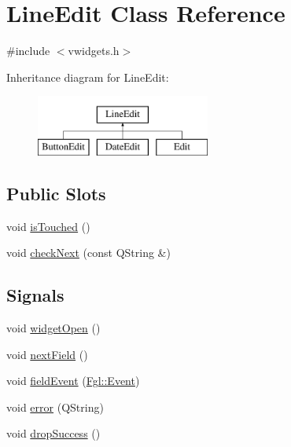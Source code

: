 \hypertarget{classLineEdit}{
\section{LineEdit Class Reference}
\label{classLineEdit}
}


{\ttfamily \#include $<$vwidgets.h$>$}

Inheritance diagram for LineEdit:\begin{figure}[H]
\begin{center}
\leavevmode
\includegraphics[height=2.000000cm]{classLineEdit}
\end{center}
\end{figure}
\subsection*{Public Slots}
\begin{DoxyCompactItemize}
\item 
void \hyperlink{classLineEdit_ad3cd1fe6bd62dfbd72e071054711015d}{isTouched} ()
\item 
void \hyperlink{classLineEdit_ae01737e586a9fc6f880c15885b7e8479}{checkNext} (const QString \&)
\end{DoxyCompactItemize}
\subsection*{Signals}
\begin{DoxyCompactItemize}
\item 
void \hyperlink{classLineEdit_a5d13e4462115bd039c90f38429a7de14}{widgetOpen} ()
\item 
void \hyperlink{classLineEdit_ad00eb1212a7343c7f80d65a19d23c4e0}{nextField} ()
\item 
void \hyperlink{classLineEdit_acb394b5ebd47db7a2fddf3ba3d57344e}{fieldEvent} (\hyperlink{structFgl_1_1Event}{Fgl::Event})
\item 
void \hyperlink{classLineEdit_afb721c2578c83bad5d35f84e069b615a}{error} (QString)
\item 
void \hyperlink{classLineEdit_a54187e66ebc1bdad7421e3b20b996444}{dropSuccess} ()
\end{DoxyCompactItemize}
